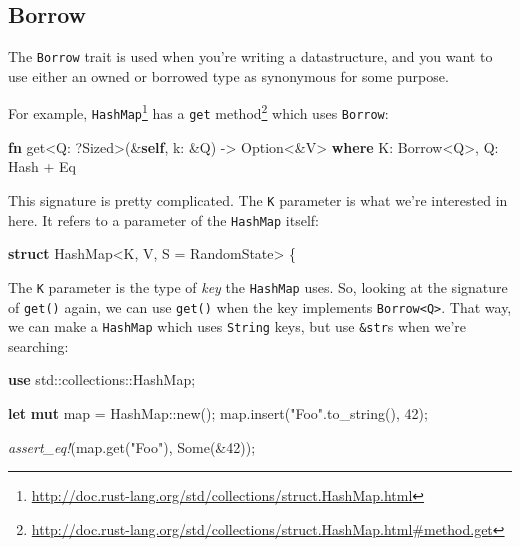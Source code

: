 \documentclass[a4paper,]{book}
\newenvironment{Shaded}{\begin{snugshade}}{\end{snugshade}}
\newcommand{\KeywordTok}[1]{\textcolor[rgb]{0.13,0.29,0.53}{\textbf{{#1}}}}
\newcommand{\DataTypeTok}[1]{\textcolor[rgb]{0.13,0.29,0.53}{{#1}}}
\newcommand{\DecValTok}[1]{\textcolor[rgb]{0.00,0.00,0.81}{{#1}}}
\newcommand{\ConstantTok}[1]{\textcolor[rgb]{0.00,0.00,0.00}{{#1}}}
\newcommand{\StringTok}[1]{\textcolor[rgb]{0.31,0.60,0.02}{{#1}}}
\newcommand{\BuiltInTok}[1]{{#1}}
\newcommand{\PreprocessorTok}[1]{\textcolor[rgb]{0.56,0.35,0.01}{\textit{{#1}}}}
\newcommand{\NormalTok}[1]{{#1}}
\renewcommand{\href}[2]{#2\footnote{\url{#1}}}
\begin{document}
\subsection{Borrow}\label{borrow}

The \texttt{Borrow} trait is used when you're writing a datastructure,
and you want to use either an owned or borrowed type as synonymous for
some purpose.

For example,
\href{http://doc.rust-lang.org/std/collections/struct.HashMap.html}{\texttt{HashMap}}
has a
\href{http://doc.rust-lang.org/std/collections/struct.HashMap.html\#method.get}{\texttt{get}
method} which uses \texttt{Borrow}:

\begin{Shaded}
\begin{Highlighting}[]
\KeywordTok{fn} \NormalTok{get<Q: ?}\BuiltInTok{Sized}\NormalTok{>(&}\KeywordTok{self}\NormalTok{, k: &Q) -> }\DataTypeTok{Option}\NormalTok{<&V>}
    \KeywordTok{where} \NormalTok{K: Borrow<Q>,}
          \NormalTok{Q: }\BuiltInTok{Hash} \NormalTok{+ }\BuiltInTok{Eq}
\end{Highlighting}
\end{Shaded}

This signature is pretty complicated. The \texttt{K} parameter is what
we're interested in here. It refers to a parameter of the
\texttt{HashMap} itself:

\begin{Shaded}
\begin{Highlighting}[]
\KeywordTok{struct} \NormalTok{HashMap<K, V, S = RandomState> \{}
\end{Highlighting}
\end{Shaded}

The \texttt{K} parameter is the type of \emph{key} the \texttt{HashMap}
uses. So, looking at the signature of \texttt{get()} again, we can use
\texttt{get()} when the key implements
\texttt{Borrow\textless{}Q\textgreater{}}. That way, we can make a
\texttt{HashMap} which uses \texttt{String} keys, but use
\texttt{\&str}s when we're searching:

\begin{Shaded}
\begin{Highlighting}[]
\KeywordTok{use} \NormalTok{std::collections::HashMap;}

\KeywordTok{let} \KeywordTok{mut} \NormalTok{map = HashMap::new();}
\NormalTok{map.insert(}\StringTok{"Foo"}\NormalTok{.to_string(), }\DecValTok{42}\NormalTok{);}

\PreprocessorTok{assert_eq!}\NormalTok{(map.get(}\StringTok{"Foo"}\NormalTok{), }\ConstantTok{Some}\NormalTok{(&}\DecValTok{42}\NormalTok{));}
\end{Highlighting}
\end{Shaded}
\end{document}
